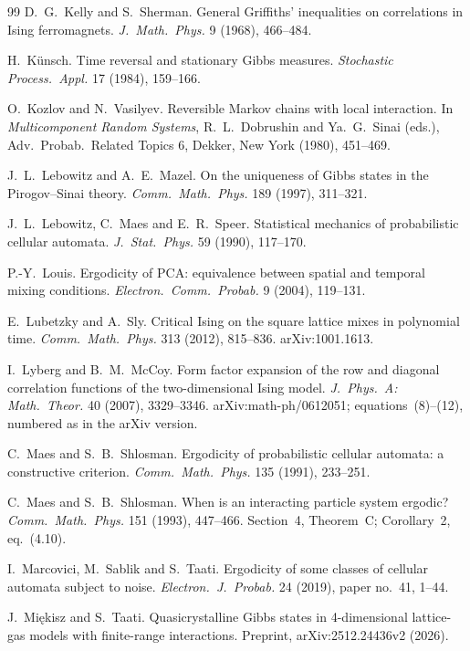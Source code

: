 \documentclass[11pt]{article}
\theoremstyle{plain}
\theoremstyle{definition}
\theoremstyle{remark}
\begin{document}
\begin{thebibliography}{99}
 D.~G.~Kelly and S.~Sherman. General Griffiths' inequalities on correlations in Ising ferromagnets. \emph{J.\ Math.\ Phys.} 9 (1968), 466--484.

 H.~K\"unsch. Time reversal and stationary Gibbs measures. \emph{Stochastic Process.\ Appl.} 17 (1984), 159--166.

 O.~Kozlov and N.~Vasilyev. Reversible Markov chains with local interaction. In \emph{Multicomponent Random Systems}, R.~L.~Dobrushin and Ya.~G.~Sinai (eds.), Adv.\ Probab.\ Related Topics 6, Dekker, New York (1980), 451--469.

 J.~L.~Lebowitz and A.~E.~Mazel. On the uniqueness of Gibbs states in the Pirogov--Sinai theory. \emph{Comm.\ Math.\ Phys.} 189 (1997), 311--321.

 J.~L.~Lebowitz, C.~Maes and E.~R.~Speer. Statistical mechanics of probabilistic cellular automata. \emph{J.\ Stat.\ Phys.} 59 (1990), 117--170.

 P.-Y.~Louis. Ergodicity of PCA: equivalence between spatial and temporal mixing conditions. \emph{Electron.\ Comm.\ Probab.} 9 (2004), 119--131.

 E.~Lubetzky and A.~Sly. Critical Ising on the square lattice mixes in polynomial time. \emph{Comm.\ Math.\ Phys.} 313 (2012), 815--836. arXiv:1001.1613.

 I.~Lyberg and B.~M.~McCoy. Form factor expansion of the row and diagonal correlation functions of the two-dimensional Ising model. \emph{J.\ Phys.\ A: Math.\ Theor.} 40 (2007), 3329--3346. arXiv:math-ph/0612051; equations~(8)--(12), numbered as in the arXiv version.

 C.~Maes and S.~B.~Shlosman. Ergodicity of probabilistic cellular automata: a constructive criterion. \emph{Comm.\ Math.\ Phys.} 135 (1991), 233--251.

 C.~Maes and S.~B.~Shlosman. When is an interacting particle system ergodic? \emph{Comm.\ Math.\ Phys.} 151 (1993), 447--466. Section~4, Theorem~C; Corollary~2, eq.~(4.10).

 I.~Marcovici, M.~Sablik and S.~Taati. Ergodicity of some classes of cellular automata subject to noise. \emph{Electron.\ J.\ Probab.} 24 (2019), paper no.~41, 1--44.

 J.~Mi\k{e}kisz and S.~Taati. Quasicrystalline Gibbs states in 4-dimensional lattice-gas models with finite-range interactions. Preprint, arXiv:2512.24436v2 (2026).


\end{thebibliography}
\end{document}
